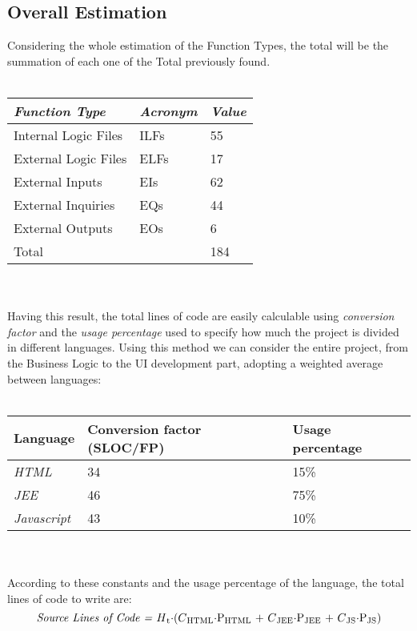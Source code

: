 \documentclass[11pt,a4paper]{report}
\begin{document}
\subsection{Overall Estimation}
Considering the whole estimation of the Function Types, the total will be the summation of each one of the Total previously found. 
\\\\
\begin{tabularx}{\textwidth}{|X|X|X|}
	\hline
	\textit{Function Type} & \textit{Acronym} & \textit{Value}\\
	\hline
	Internal Logic Files & ILFs & 55\\
	\hline
	External Logic Files & ELFs & 17\\
	\hline
	External Inputs & EIs & 62\\
	\hline
	External Inquiries & EQs & 44\\
	\hline
	External Outputs & EOs & 6\\
	\hline
	\hline
	Total & \multicolumn{1}{X}{} & \multicolumn{1}{X|}{184}\\
	\hline
\end{tabularx}
\\\\
Having this result, the total lines of code are easily calculable using   \textit{conversion factor} and the \textit{usage percentage} used to specify how much the project is divided in different languages. Using this method we can consider the entire project, from the Business Logic to the UI development part, adopting a weighted average between languages:
\\\\
\begin{tabularx}{\textwidth}{|X|X|X|}
	\hline
	\textbf{Language} & \textbf{Conversion factor (SLOC/FP)} & \textbf{Usage percentage}\\
	\hline
	\textit{HTML} & 34 & 15\%\\
	\hline
	\textit{JEE} & 46 & 75\%\\
	\hline
	\textit{Javascript} & 43 & 10\%\\
	\hline
\end{tabularx}
\\\\
According to these constants and the usage percentage of the language, the total lines of code to write are:\\
\begin{equation}
	\centerline{\textit{Source Lines of Code =} $H\textsubscript{t}\cdot$($C\textsubscript{HTML}\cdot$P\textsubscript{HTML} + $C\textsubscript{JEE}\cdot$P\textsubscript{JEE} + $C\textsubscript{JS}\cdot$P\textsubscript{JS})}
\end{equation}
\end{document}

